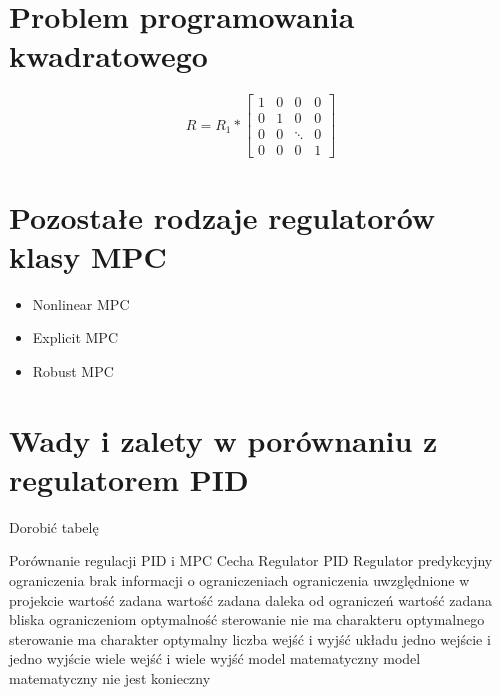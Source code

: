 \section{Problem programowania kwadratowego} \label{sec:qp}
\begin{equation}
	R = R_{1} * \begin{bmatrix}
	1 & 0 & 0 & 0 \\
	0 & 1 & 0 & 0 \\
	0 & 0 &\ddots & 0 \\
	0 & 0 & 0 & 1
	\end{bmatrix}
\label{eq:hessian}
\end{equation}

\section{Pozostałe rodzaje regulatorów klasy MPC} \label{sec:other}

\begin{itemize}
	\item Nonlinear MPC
	\item Explicit MPC
    \item Robust MPC
\end{itemize}

\section{Wady i zalety w porównaniu z regulatorem PID} \label{sec:comparison}
Dorobić tabelę

Porównanie regulacji PID i MPC
Cecha	Regulator PID	Regulator predykcyjny
ograniczenia	brak informacji o ograniczeniach	ograniczenia uwzględnione w projekcie
wartość zadana	wartość zadana daleka od ograniczeń	wartość zadana bliska ograniczeniom
optymalność	sterowanie nie ma charakteru optymalnego	sterowanie ma charakter optymalny
liczba wejść i wyjść układu	jedno wejście i jedno wyjście	wiele wejść i wiele wyjść
model matematyczny	model matematyczny nie jest konieczny